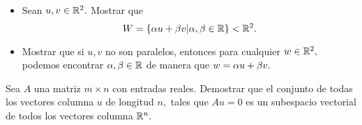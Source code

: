 \begin{problema}[\dag]
\begin{itemize}
 \item Sean $u,v \in \mathbb{R}^{2}.$ Mostrar que $$W=\left\{ \alpha u+ \beta v| \alpha, \beta \in \mathbb{R} \right\} < \mathbb{R}^{2}.$$
 \item Mostrar que si $u,v$ no son paralelos, entonces para cualquier $w\in \mathbb{R}^{2},$ podemos encontrar $\alpha,\beta \in
\mathbb{R}$ de manera que $w= \alpha u + \beta v.$
\end{itemize}
\end{problema}

\begin{problema}[\dag]
 Sea $A$ una matriz $m\times n$ con entradas reales. Demostrar que el conjunto de todas los vectores columna $u$ de
longitud $n,$ tales que $Au=0$ es un subespacio vectorial de todos los vectores columna $\mathbb{R}^{n}.$
\end{problema}
